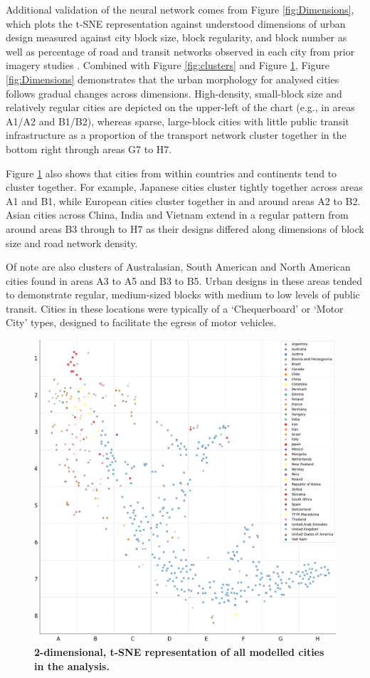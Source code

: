 \documentclass[preprint,12pt]{elsarticle}
\begin{document}
Additional validation of the neural network comes from Figure \ref{fig:Dimensions}, which plots the t-SNE representation against understood dimensions of urban design measured against city block size, block regularity, and block number as well as percentage of road and transit networks observed in each city from prior imagery studies \cite{Thompson2020}. Combined with Figure \ref{fig:clusters} and Figure \ref{fig:tSNE}, Figure \ref{fig:Dimensions} demonstrates that the urban morphology for analysed cities follows gradual changes across dimensions. High-density, small-block size and relatively regular cities are depicted on the upper-left of the chart (e.g., in areas A1/A2 and B1/B2), whereas sparse, large-block cities with little public transit infrastructure as a proportion of the transport network cluster together in the bottom right through areas G7 to H7. 

Figure \ref{fig:tSNE} also shows that cities from within countries and continents tend to cluster together. For example, Japanese cities cluster tightly together across areas A1 and B1, while European cities cluster together in and around areas A2 to B2. Asian cities across China, India and Vietnam extend in a regular pattern from around areas B3 through to H7 as their designs differed along dimensions of block size and road network density.

Of note are also clusters of Australasian, South American and North American cities found in areas A3 to A5 and B3 to B5. Urban designs in these areas tended to demonstrate regular, medium-sized blocks with medium to low levels of public transit. Cities in these locations were typically of a `Chequerboard' or `Motor City' types, designed to facilitate the egress of motor vehicles.

\begin{figure}
\centering
\includegraphics[trim={ 0 0 0 0 },clip,scale=0.45]{Images/tSNE Country.png}
\caption{\bf 2-dimensional, t-SNE representation of all modelled cities in the analysis.}
 \label{fig:tSNE}
\end{figure}
\end{document}
